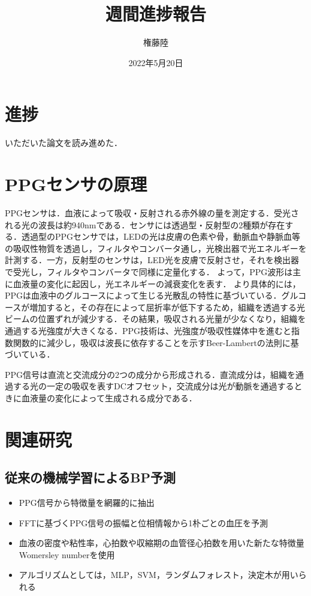 \documentclass[dvipdfmx]{jsarticle}
\begin{document}
\title{週間進捗報告}
\author{権藤陸}
\date{2022年5月20日}
\maketitle
\section{進捗}
いただいた論文を読み進めた．
\section{PPGセンサの原理 \cite{ppg}}
PPGセンサは．血液によって吸収・反射される赤外線の量を測定する．受光される光の波長は約940nmである．センサには透過型・反射型の2種類が存在する．透過型のPPGセンサでは，LEDの光は皮膚の色素や骨，動脈血や静脈血等の吸収性物質を透過し，フィルタやコンバータ通し，光検出器で光エネルギーを計測する．一方，反射型のセンサは，LED光を皮膚で反射させ，それを検出器で受光し，フィルタやコンバータで同様に定量化する．
よって，PPG波形は主に血液量の変化に起因し，光エネルギーの減衰変化を表す．
より具体的には，PPGは血液中のグルコースによって生じる光散乱の特性に基づいている．グルコースが増加すると，その存在によって屈折率が低下するため，組織を透過する光ビームの位置ずれが減少する．その結果，吸収される光量が少なくなり，組織を通過する光強度が大きくなる．PPG技術は、光強度が吸収性媒体中を進むと指数関数的に減少し，吸収は波長に依存することを示すBeer-Lambertの法則に基づいている．

PPG信号は直流と交流成分の2つの成分から形成される．直流成分は，組織を通過する光の一定の吸収を表すDCオフセット，交流成分は光が動脈を通過するときに血液量の変化によって生成される成分である．


\section{関連研究}
\subsection{従来の機械学習によるBP予測}
\begin{itemize}
    \item PPG信号から特徴量を網羅的に抽出
    \item FFTに基づくPPG信号の振幅と位相情報から1朴ごとの血圧を予測
    \item 血液の密度や粘性率，心拍数や収縮期の血管径心拍数を用いた新たな特徴量Womersley numberを使用
    \item アルゴリズムとしては，MLP，SVM，ランダムフォレスト，決定木が用いられる
\end{itemize}
\end{document}
